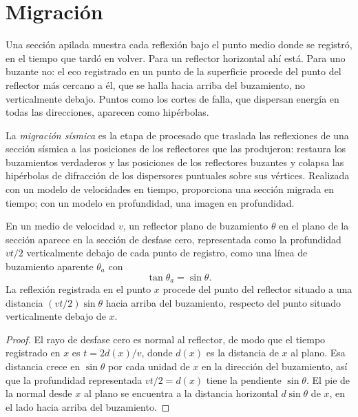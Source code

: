 \section{Migración}

Una sección apilada muestra cada reflexión bajo el punto medio donde se
registró, en el tiempo que tardó en volver. Para un reflector horizontal ahí
está. Para uno buzante no: el eco registrado en un punto de la superficie
procede del punto del reflector más cercano a él, que se halla hacia arriba
del buzamiento, no verticalmente debajo. Puntos como los cortes de falla, que
dispersan energía en todas las direcciones, aparecen como hipérbolas.

\begin{definition}\label{def:b3:exploration-seismology:migration}
La \emph{migración sísmica} es la etapa de
procesado que traslada las reflexiones de una sección sísmica a las posiciones
de los reflectores que las produjeron: restaura los buzamientos verdaderos y las
posiciones de los reflectores buzantes y colapsa las hipérbolas de difracción de
los dispersores puntuales sobre sus vértices. Realizada con un modelo de
velocidades en tiempo, proporciona una sección migrada en tiempo; con un modelo en profundidad, una imagen en profundidad.
\end{definition}

\begin{theorem}\label{thm:b3:exploration-seismology:dip}
En un medio de velocidad $v$, un reflector plano de buzamiento $\theta$ en el
plano de la sección aparece en la sección de desfase cero, representada como la
profundidad $vt/2$ verticalmente debajo de cada punto de registro, como una
línea de buzamiento aparente $\theta_a$ con
\[
  \tan\theta_a = \sin\theta .
\]
La reflexión registrada en el punto $x$ procede del punto del reflector situado a
una distancia $(vt/2)\sin\theta$ hacia arriba del buzamiento, respecto del punto situado verticalmente debajo de $x$.
\end{theorem}

\begin{proof}
El rayo de desfase cero es normal al reflector, de modo que el tiempo registrado
en $x$ es $t = 2d(x)/v$, donde $d(x)$ es la distancia de $x$ al plano. Esa
distancia crece en $\sin\theta$ por cada unidad de $x$ en la dirección del
buzamiento, así que la profundidad representada $vt/2 = d(x)$ tiene la
pendiente $\sin\theta$. El pie de la normal desde $x$ al plano se encuentra a
la distancia horizontal $d\sin\theta$ de $x$, en el lado hacia arriba del buzamiento.
\end{proof}

